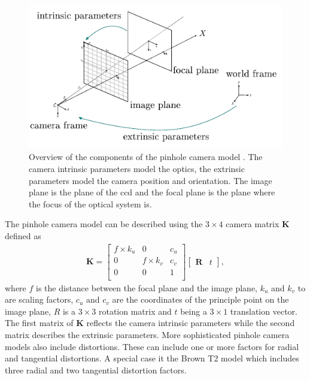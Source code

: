 \begin{figure}[htb]
    \centering
    \includegraphics[width=\textwidth]{doc/thesis/0_figures/sfm/pinholeCamera.png}
    \caption{Overview of the components of the pinhole camera model \cite{openMVG}. The camera intrinsic parameters model the optics, the extrinsic parameters model the camera position and orientation. The image plane is the plane of the \gls{ccd} and the focal plane is the plane where the focus of the optical system is.}
    \label{fig:pinhole_cam}
\end{figure} 

The pinhole camera model can be described using the $3\times4$ camera matrix $\textbf{K}$ defined as
\begin{align}
    \textbf{K} = \begin{bmatrix}
        f\times k_u & 0           & c_u \\
        0           & f\times k_v & c_v \\
        0           & 0           & 1   \\
    \end{bmatrix} 
    \begin{bmatrix}
        \textbf{R} & t
    \end{bmatrix}, \label{eq:camera_m}
\end{align}
where $f$ is the distance between the focal plane and the image plane, $k_u$ and $k_v$ to are scaling factors, $c_u$ and $c_v$ are the coordinates of the principle point on the image plane, $R$ is a $3\times3$ rotation matrix and $t$ being a $3\times1$ translation vector. The first matrix of $\textbf{K}$ reflects the camera intrinsic parameters while the second matrix describes the extrinsic parameters.
More sophisticated pinhole camera models also include distortions. These can include one or more factors for radial and tangential distortions. A special case it the Brown T2 model which includes three radial and two tangential distortion factors.

